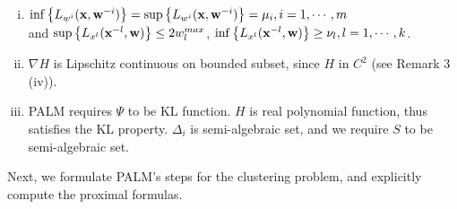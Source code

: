 \documentclass[11pt]{article}
\numberwithin{equation}{section}
\begin{document}
\begin{enumerate}[(i)]
  \item $\inf \left\lbrace L_{w^i}({\bf x}, {\bf w}^{-i}) \right\rbrace = \sup \left\lbrace L_{w^i}({\bf x}, {\bf w}^{-i}) \right\rbrace = \mu_i, i=1, \cdots ,m$ \\ and $\sup \left\lbrace L_{x^l}({\bf x}^{-l}, {\bf w}) \right\rbrace \leq 2w^{max}_l$, $\inf \left\lbrace L_{x^l}({\bf x}^{-l}, {\bf w}) \right\rbrace\geq \nu_l, l=1, \cdots ,k$.
  \item $\nabla H$ is Lipschitz continuous on bounded subset, since $H$ in $C^2$ (see Remark 3 (iv)).
  \item PALM requires $\Psi$ to be KL function. $H$ is real polynomial function, thus satisfies the KL property. $\Delta_i$ is semi-algebraic set, and we require $S$ to be semi-algebraic set.
\end{enumerate}

Next, we formulate PALM's steps for the clustering problem, and explicitly compute the proximal formulas.
\end{document}
